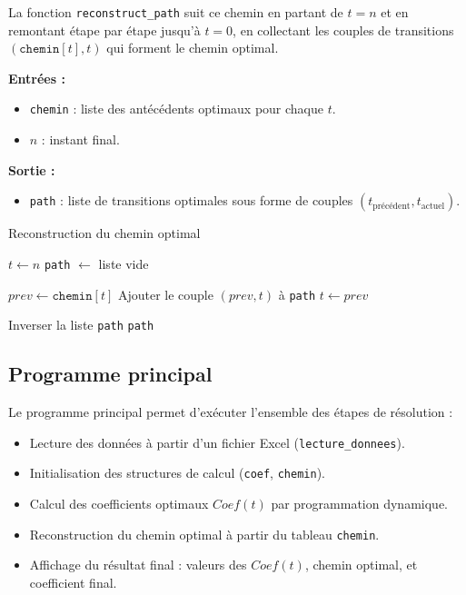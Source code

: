 \documentclass[a4paper,11pt]{article}
\begin{document}
La fonction \texttt{reconstruct\_path} suit ce chemin en partant de $t = n$ et en remontant étape par étape jusqu’à $t = 0$, en collectant les couples de transitions $(\texttt{chemin}[t], t)$ qui forment le chemin optimal.

\vspace{0.3cm}

\noindent \textbf{Entrées :}
\begin{itemize}
    \item \texttt{chemin} : liste des antécédents optimaux pour chaque $t$.
    \item $n$ : instant final.
\end{itemize}

\noindent \textbf{Sortie :}
\begin{itemize}
    \item \texttt{path} : liste de transitions optimales sous forme de couples $(t_\text{précédent}, t_\text{actuel})$.
\end{itemize}

\begin{algorithm}[H]
\caption{Reconstruction du chemin optimal}
\begin{algorithmic}[1]
    \State $t \gets n$
    \State \texttt{path} $\gets$ liste vide

        \State $prev \gets \texttt{chemin}[t]$
        \State Ajouter le couple $(prev, t)$ à \texttt{path}
        \State $t \gets prev$
    \EndWhile

    \State Inverser la liste \texttt{path} 
    \State \Return \texttt{path}
\EndFunction
\end{algorithmic}
\end{algorithm}



\subsection{Programme principal}

Le programme principal permet d’exécuter l’ensemble des étapes de résolution :

\begin{itemize}
    \item Lecture des données à partir d’un fichier Excel (\texttt{lecture\_donnees}).
    \item Initialisation des structures de calcul (\texttt{coef}, \texttt{chemin}).
    \item Calcul des coefficients optimaux $Coef(t)$ par programmation dynamique.
    \item Reconstruction du chemin optimal à partir du tableau \texttt{chemin}.
    \item Affichage du résultat final : valeurs des $Coef(t)$, chemin optimal, et coefficient final.
\end{itemize}
\end{document}
